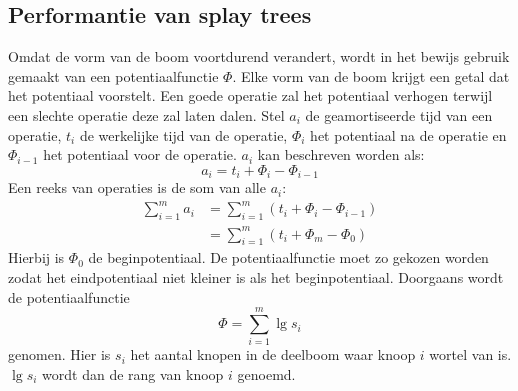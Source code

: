 \documentclass{report}
\begin{document}
	\subsection{Performantie van splay trees}
	Omdat de vorm van de boom voortdurend verandert, wordt in het bewijs gebruik gemaakt van een potentiaalfunctie $\Phi$. Elke vorm van de boom krijgt een getal dat het potentiaal voorstelt. Een goede operatie zal het potentiaal verhogen terwijl een slechte operatie deze zal laten dalen. Stel $a_i$ de geamortiseerde tijd van een operatie, $t_i$ de werkelijke tijd van de operatie, $\Phi_i$ het potentiaal na de operatie en $\Phi_{i - 1}$ het potentiaal voor de operatie. $a_i$ kan beschreven worden als: 
	$$a_i = t_i + \Phi_i - \Phi_{i - 1}$$ Een reeks van operaties is de som van alle $a_i$:
	\begin{equation*}
	\begin{split}
		\sum_{i = 1}^{m} a_i & = \sum_{i = 1}^{m} (t_i + \Phi_i - \Phi_{i - 1}) \\
							   & =  \sum_{i = 1}^{m} (t_i + \Phi_m - \Phi_0)
	\end{split}
	\end{equation*}
	Hierbij is $\Phi_0$ de beginpotentiaal. De potentiaalfunctie moet zo gekozen worden zodat het eindpotentiaal niet kleiner is als het beginpotentiaal. Doorgaans wordt de potentiaalfunctie 
	$$\Phi = \sum_{i = 1}^m \lg s_i$$
	genomen. Hier is $s_i$ het aantal knopen in de deelboom waar knoop $i$ wortel van is. $\lg s_i$ wordt dan de rang van knoop $i$ genoemd.
	

	
	
	
\end{document}
